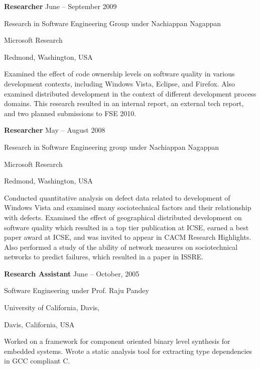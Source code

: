 \documentclass[margin,line,article,letterpaper]{res}
\newenvironment{list1}{
  \begin{list}{}{%
      \setlength{\itemsep}{0in}
      \setlength{\parsep}{0in} \setlength{\parskip}{0in}
      \setlength{\topsep}{0in} \setlength{\partopsep}{0in} 
      \setlength{\leftmargin}{0.17in}}}{\end{list}}
\newcommand{\timespan}[1]{#1}
\begin{document}
\begin{resume}
\textbf{Researcher} \hfill \timespan{June -- September 2009}\\
\vspace{-10pt}
\begin{list1}
\item Research in Software Engineering Group under Nachiappan Nagappan
\item Microsoft Research
\item Redmond, Washington, USA
\vspace{6pt}
\item Examined the effect of code ownership levels on software quality in various
	development contexts, including Windows Vista, Eclipse, and Firefox.  Also
	examined distributed development in the context of different development
	process domains.  This research resulted in an internal report, an external
	tech report, and two planned submissions to FSE 2010.
\end{list1}

\textbf{Researcher} \hfill \timespan{May -- August 2008}\\
\vspace{-10pt}
\begin{list1}
\item Research in Software Engineering group under Nachiappan Nagappan
\item Microsoft Research
\item Redmond, Washington, USA
\vspace{6pt}
\item Conducted quantitative analysis on defect data related to development of Windows 
Vista and examined many sociotechnical factors and their relationship with defects. 
Examined the effect of geographical distributed development on software quality which 
resulted in a top tier publication at ICSE, earned a best paper award at ICSE,
and was invited to appear in CACM Research Highlights.  Also performed a study
of the ability of network measures on sociotechnical networks to predict failures,
which resulted in a paper in ISSRE.
\end{list1}

\textbf{Research Assistant} \hfill \timespan{June -- October, 2005}\\
\vspace{-10pt}
\begin{list1}
\item Software Engineering under Prof. Raju Pandey
\item University of California, Davis,
\item Davis, California, USA
\vspace{6pt}
\item Worked on a framework for component oriented binary level synthesis for embedded 
systems. Wrote a static analysis tool for extracting type dependencies in GCC compliant 
C. 
\end{list1}


\end{resume}
\end{document}
